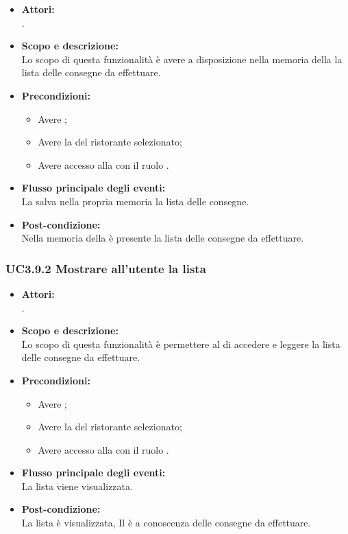 \begin{itemize}
	\item \textbf{Attori:}
	\\.
	\item \textbf{Scopo e descrizione:} 
	\\Lo scopo di questa funzionalità è avere a disposizione nella memoria della  la lista delle consegne da effettuare.
	\item \textbf{Precondizioni:}
	\begin{itemize}
		\item Avere ;
		\item Avere la  del ristorante selezionato;
		\item Avere accesso alla  con il ruolo .
	\end{itemize}
	\item \textbf{Flusso principale degli eventi:}
	\\La {} salva nella propria memoria la lista delle consegne.
	\item \textbf{Post-condizione:}
	\\Nella memoria della  è presente la lista delle consegne da effettuare.
\end{itemize}

\subsubsection{UC3.9.2 Mostrare all'utente la lista} \label{UC3.9.2}

\begin{itemize}
	\item \textbf{Attori:}
	\\.
	\item \textbf{Scopo e descrizione:} 
	\\Lo scopo di questa funzionalità è permettere al  di accedere e leggere la lista delle consegne da effettuare.
	\item \textbf{Precondizioni:}
	\begin{itemize}
		\item Avere ;
		\item Avere la  del ristorante selezionato;
		\item Avere accesso alla  con il ruolo .
	\end{itemize}
	\item \textbf{Flusso principale degli eventi:}
	\\La lista viene visualizzata.
	\item \textbf{Post-condizione:}
	\\La lista è visualizzata, Il  è a conoscenza delle consegne da effettuare.
\end{itemize}

